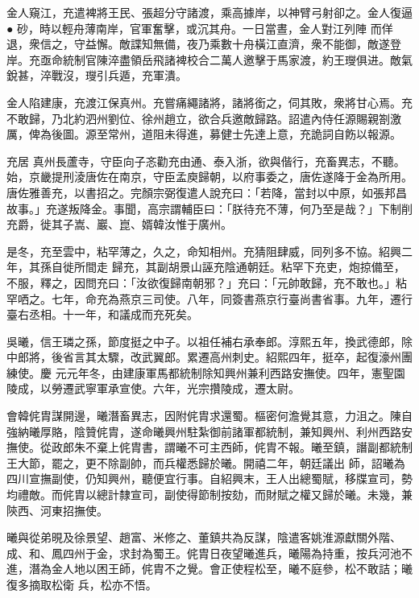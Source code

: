 \begin{pinyinscope}
金人窺江，充遣裨將王民、張超分守諸渡，乘高據岸，以神臂弓射卻之。金人復逼●
 砂，時以輕舟薄南岸，官軍奮擊，或沉其舟。一日當晝，金人對江列陣
 而佯退，衆信之，守益懈。敵諜知無備，夜乃乘數十舟橫江直濟，衆不能御，敵遂登岸。充亟命統制官陳淬盡領岳飛諸裨校合二萬人邀擊于馬家渡，約王𤫉俱进。敵氣銳甚，淬戰沒，𤫉引兵遁，充軍潰。



 金人陷建康，充渡江保真州。充嘗痛繩諸將，諸將銜之，伺其敗，衆將甘心焉。充不敢歸，乃北約泗州劉位、徐州趙立，欲合兵邀敵歸路。詔遣內侍任源賜親劄激厲，俾為後圖。源至常州，道阻未得進，募健士先達上意，充詭詞自飭以報源。



 充居
 真州長蘆寺，守臣向子忞勸充由通、泰入浙，欲與偕行，充畜異志，不聽。始，京畿提刑淩唐佐在南京，守臣孟庾歸朝，以府事委之，唐佐遂降于金為所用。唐佐雅善充，以書招之。完顏宗弼復遣人說充曰：「若降，當封以中原，如張邦昌故事。」充遂叛降金。事聞，高宗謂輔臣曰：「朕待充不薄，何乃至是哉？」下制削充爵，徙其子嵩、巖、崑、婿韓汝惟于廣州。



 是冬，充至雲中，粘罕薄之，久之，命知相州。充猜阻肆威，同列多不協。紹興二年，其孫自徙所間走
 歸充，其副胡景山誣充陰通朝廷。粘罕下充吏，炮掠備至，不服，釋之，因問充曰：「汝欲復歸南朝邪？」充曰：「元帥敢歸，充不敢也。」粘罕哂之。七年，命充為燕京三司使。八年，同簽書燕京行臺尚書省事。九年，遷行臺右丞相。十一年，和議成而充死矣。



 吳曦，信王璘之孫，節度挺之中子。以祖任補右承奉郎。淳熙五年，換武德郎，除中郎將，後省言其太驟，改武翼郎。累遷高州刺史。紹熙四年，挺卒，起復濠州團練使。慶
 元元年冬，由建康軍馬都統制除知興州兼利西路安撫使。四年，憲聖園陵成，以勞遷武寧軍承宣使。六年，光宗攢陵成，遷太尉。



 會韓侂胄謀開邊，曦潛畜異志，因附侂胄求還蜀。樞密何澹覺其意，力沮之。陳自強納曦厚賂，陰贊侂胄，遂命曦興州駐紮御前諸軍都統制，兼知興州、利州西路安撫使。從政郎朱不棄上侂胄書，謂曦不可主西師，侂胄不報。曦至鎮，譖副都統制王大節，罷之，更不除副帥，而兵權悉歸於曦。開禧二年，朝廷議出
 師，詔曦為四川宣撫副使，仍知興州，聽便宜行事。自紹興末，王人出總蜀賦，移牒宣司，勢均禮敵。而侂胄以總計隸宣司，副使得節制按劾，而財賦之權又歸於曦。未幾，兼陝西、河東招撫使。



 曦與從弟晛及徐景望、趙富、米修之、董鎮共為反謀，陰遣客姚淮源獻關外階、成、和、鳳四州于金，求封為蜀王。侂胄日夜望曦進兵，曦陽為持重，按兵河池不進，潛為金人地以困王師，侂胄不之覺。會正使程松至，曦不庭參，松不敢詰；曦復多摘取松衛
 兵，松亦不悟。




\end{pinyinscope}
